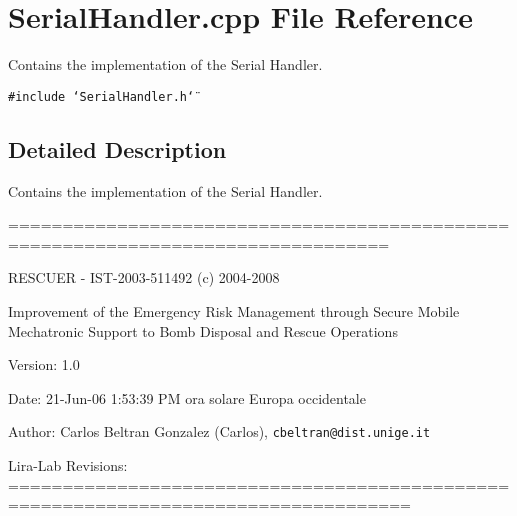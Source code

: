 \section{Serial\-Handler.cpp File Reference}
\label{SerialHandler_8cpp}
Contains the implementation of the Serial Handler.  


{\tt \#include \char`\"{}Serial\-Handler.h\char`\"{}}\par


\subsection{Detailed Description}
Contains the implementation of the Serial Handler. 

=================================================================================

RESCUER - IST-2003-511492 (c) 2004-2008

Improvement of the Emergency Risk Management through Secure Mobile Mechatronic Support to Bomb Disposal and Rescue Operations

\begin{Desc}
\item[Version:]1.0 \end{Desc}
\begin{Desc}
\item[Date:]21-Jun-06 1:53:39 PM ora solare Europa occidentale \end{Desc}
\begin{Desc}
\item[Author:]Carlos Beltran Gonzalez (Carlos), {\tt cbeltran@dist.unige.it} 

Lira-Lab Revisions: ===================================================================================\end{Desc}
